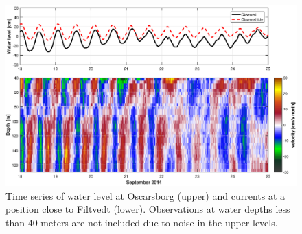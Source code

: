 
\begin{figure}[!t]
\centering
\includegraphics[width=\textwidth]{fig_Filtvedt_timeseries_obs}
\caption{Time series of water level at Oscarsborg (upper) and currents at a position close to Filtvedt (lower). Observations at water depths less than 40 meters are not included due to noise in the upper levels.}
\label{fig:Filtvedt_timeseries_obs}
\end{figure}


